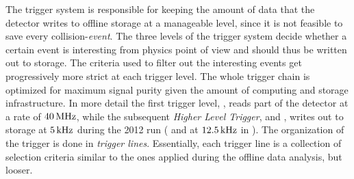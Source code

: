 
The trigger system is responsible for keeping the amount of data that the detector writes to offline storage
at a manageable level, since it is not feasible to save every collision-{\it event}. The three levels of
the \lhcb trigger system decide whether a certain event is interesting from physics point
of view and should thus be written out to storage. The criteria used to filter out the interesting events
get progressively more strict at each trigger level. The whole trigger chain is optimized for maximum
signal purity given the amount of computing and storage infrastructure. In more detail the first trigger
level, \lzero, reads part of the detector at a rate of $40{\rm \,MHz}$, while the subsequent {\it Higher Level Trigger},
\hltone and \hlttwo, writes out to storage at $5{\rm \,kHz}$ during the 2012 run ( and at $12.5{\rm \,kHz}$ in \runtwo).
The organization of the trigger is done in {\it trigger lines}. Essentially, each trigger line is
a collection of selection criteria similar to the ones applied during the offline data analysis, but looser.

